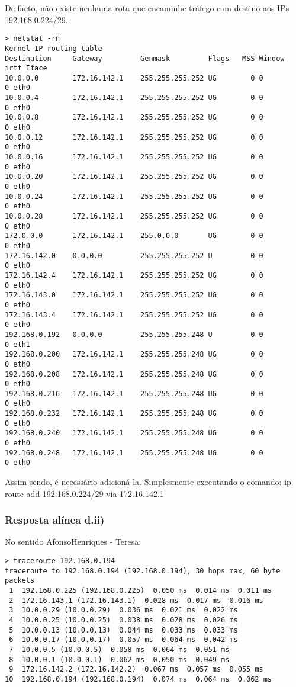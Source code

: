 \documentclass{article}
\begin{document}
De facto, não existe nenhuma rota que encaminhe tráfego com destino aos IPs 192.168.0.224/29.

\begin{lstlisting}
> netstat -rn
Kernel IP routing table
Destination     Gateway         Genmask         Flags   MSS Window  irtt Iface
10.0.0.0        172.16.142.1    255.255.255.252 UG        0 0          0 eth0
10.0.0.4        172.16.142.1    255.255.255.252 UG        0 0          0 eth0
10.0.0.8        172.16.142.1    255.255.255.252 UG        0 0          0 eth0
10.0.0.12       172.16.142.1    255.255.255.252 UG        0 0          0 eth0
10.0.0.16       172.16.142.1    255.255.255.252 UG        0 0          0 eth0
10.0.0.20       172.16.142.1    255.255.255.252 UG        0 0          0 eth0
10.0.0.24       172.16.142.1    255.255.255.252 UG        0 0          0 eth0
10.0.0.28       172.16.142.1    255.255.255.252 UG        0 0          0 eth0
172.0.0.0       172.16.142.1    255.0.0.0       UG        0 0          0 eth0
172.16.142.0    0.0.0.0         255.255.255.252 U         0 0          0 eth0
172.16.142.4    172.16.142.1    255.255.255.252 UG        0 0          0 eth0
172.16.143.0    172.16.142.1    255.255.255.252 UG        0 0          0 eth0
172.16.143.4    172.16.142.1    255.255.255.252 UG        0 0          0 eth0
192.168.0.192   0.0.0.0         255.255.255.248 U         0 0          0 eth1
192.168.0.200   172.16.142.1    255.255.255.248 UG        0 0          0 eth0
192.168.0.208   172.16.142.1    255.255.255.248 UG        0 0          0 eth0
192.168.0.216   172.16.142.1    255.255.255.248 UG        0 0          0 eth0
192.168.0.232   172.16.142.1    255.255.255.248 UG        0 0          0 eth0
192.168.0.240   172.16.142.1    255.255.255.248 UG        0 0          0 eth0
192.168.0.248   172.16.142.1    255.255.255.248 UG        0 0          0 eth0
\end{lstlisting}
Assim sendo, é necessário adicioná-la. Simplesmente executando o comando: ip route add 192.168.0.224/29 via 172.16.142.1

\subsubsection{Resposta alínea d.ii)}

No sentido AfonsoHenriques - Teresa:
\begin{lstlisting}
> traceroute 192.168.0.194                  
traceroute to 192.168.0.194 (192.168.0.194), 30 hops max, 60 byte packets
 1  192.168.0.225 (192.168.0.225)  0.050 ms  0.014 ms  0.011 ms
 2  172.16.143.1 (172.16.143.1)  0.028 ms  0.017 ms  0.016 ms
 3  10.0.0.29 (10.0.0.29)  0.036 ms  0.021 ms  0.022 ms
 4  10.0.0.25 (10.0.0.25)  0.038 ms  0.028 ms  0.026 ms
 5  10.0.0.13 (10.0.0.13)  0.044 ms  0.033 ms  0.033 ms
 6  10.0.0.17 (10.0.0.17)  0.057 ms  0.064 ms  0.042 ms
 7  10.0.0.5 (10.0.0.5)  0.058 ms  0.064 ms  0.051 ms
 8  10.0.0.1 (10.0.0.1)  0.062 ms  0.050 ms  0.049 ms
 9  172.16.142.2 (172.16.142.2)  0.067 ms  0.057 ms  0.055 ms
10  192.168.0.194 (192.168.0.194)  0.074 ms  0.064 ms  0.062 ms
\end{lstlisting}
\end{document}
